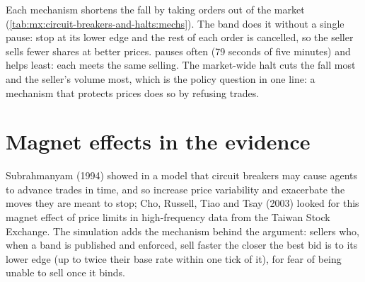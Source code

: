 Each mechanism shortens the fall by taking orders out of the market (\cref{tab:mx:circuit-breakers-and-halts:mechs}). The band does it without a single
pause:  stop at its lower edge and the rest of each order is cancelled, so the seller sells fewer shares at better prices. 
pauses often (79 seconds of five minutes) and helps least: each  meets the same selling. The market-wide halt cuts the fall most and the
seller's volume most, which is the policy question in one line: a mechanism that protects prices does so by refusing trades.

\begin{omfigure}

\label{fig:mx:circuit-breakers-and-halts:example}
\end{omfigure}

\section{Magnet effects in the evidence}

Subrahmanyam (1994) showed in a model that circuit breakers may cause agents to advance trades in time, and so increase price variability and
exacerbate the moves they are meant to stop; Cho, Russell, Tiao and Tsay (2003) looked for this magnet effect of price limits in high-frequency data
from the Taiwan Stock Exchange. The simulation adds the mechanism behind the argument: sellers who, when a band is published and enforced, sell faster
the closer the best bid is to its lower edge (up to twice their base rate within one tick of it), for fear of being unable to sell once it binds.

